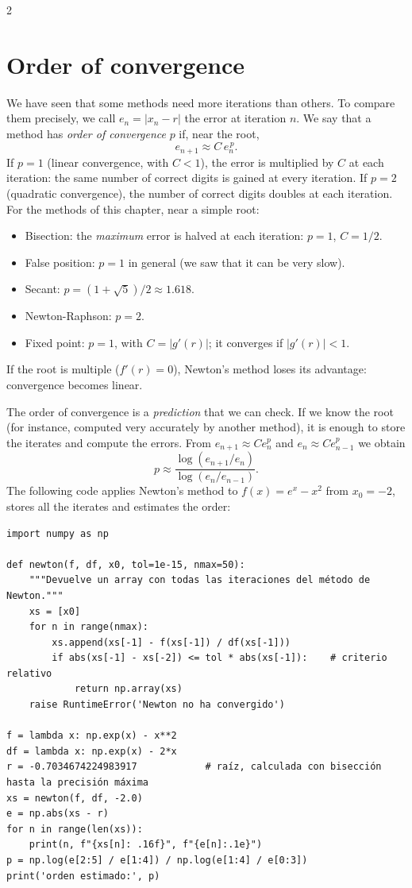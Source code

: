 \begin{paracol}{2}
\section[Order of convergence]{Order of convergence}\label{sec:orden-2}
We have seen that some methods need more iterations than others. To compare them precisely, we call $e_n=\vert x_n-r\vert$ the error at iteration $n$. We say that a method has \emph{order of convergence} $p$ if, near the root,
\begin{equation*}
e_{n+1}\approx C\,e_n^{\,p}.
\end{equation*}
If $p=1$ (linear convergence, with $C<1$), the error is multiplied by $C$ at each iteration: the same number of correct digits is gained at every iteration. If $p=2$ (quadratic convergence), the number of correct digits doubles at each iteration. For the methods of this chapter, near a simple root:
\begin{itemize}
\item Bisection: the \emph{maximum} error is halved at each iteration: $p=1$, $C=1/2$.
\item False position: $p=1$ in general (we saw that it can be very slow).
\item Secant: $p=(1+\sqrt5)/2\approx1.618$.
\item Newton-Raphson: $p=2$.
\item Fixed point: $p=1$, with $C=\vert g'(r)\vert$; it converges if $\vert g'(r)\vert<1$.
\end{itemize}
If the root is multiple ($f'(r)=0$), Newton's method loses its advantage: convergence becomes linear.

The order of convergence is a \emph{prediction} that we can check. If we know the root (for instance, computed very accurately by another method), it is enough to store the iterates and compute the errors. From $e_{n+1}\approx Ce_n^p$ and $e_n\approx Ce_{n-1}^p$ we obtain
\begin{equation*}
p\approx\frac{\log(e_{n+1}/e_n)}{\log(e_n/e_{n-1})}.
\end{equation*}
The following code applies Newton's method to $f(x)=e^x-x^2$ from $x_0=-2$, stores all the iterates and estimates the order:
\end{paracol}
\begin{verbatim}
import numpy as np

def newton(f, df, x0, tol=1e-15, nmax=50):
    """Devuelve un array con todas las iteraciones del método de Newton."""
    xs = [x0]
    for n in range(nmax):
        xs.append(xs[-1] - f(xs[-1]) / df(xs[-1]))
        if abs(xs[-1] - xs[-2]) <= tol * abs(xs[-1]):    # criterio relativo
            return np.array(xs)
    raise RuntimeError('Newton no ha convergido')

f = lambda x: np.exp(x) - x**2
df = lambda x: np.exp(x) - 2*x
r = -0.7034674224983917            # raíz, calculada con bisección hasta la precisión máxima
xs = newton(f, df, -2.0)
e = np.abs(xs - r)
for n in range(len(xs)):
    print(n, f"{xs[n]: .16f}", f"{e[n]:.1e}")
p = np.log(e[2:5] / e[1:4]) / np.log(e[1:4] / e[0:3])
print('orden estimado:', p)
\end{verbatim}
